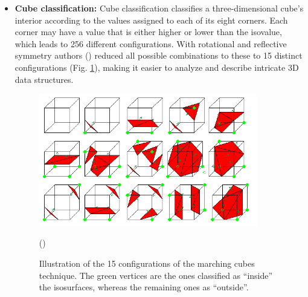 \begin{itemize}
\item \textbf{Cube classification:} Cube classification classifies a three-dimensional cube's interior according to the values assigned to each of its eight corners. 
Each corner may have a value that is either higher or lower than the isovalue, which leads to 256 different configurations. With rotational and reflective symmetry authors (\cite{Lorensen_1987}) reduced all possible combinations to these to 15 distinct configurations (Fig. \ref{fig:MC-15-cases}), making it easier to analyze and describe intricate 3D data structures.

\begin{figure}
\centering
\includegraphics[height=0.6\textwidth,width=0.9\textwidth]{Figures/MC-15-cases.png}
\decoRule
\caption{Illustration of the 15 configurations of the marching cubes technique. The green vertices are the ones classified as “inside” the isosurfaces, whereas the remaining ones as “outside”.} (\cite{Lorensen_1987})
\label{fig:MC-15-cases}
\end{figure}
    


\end{itemize}
